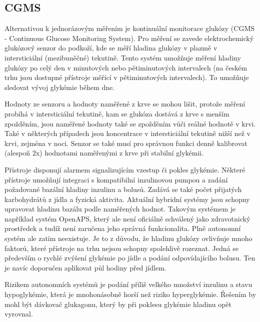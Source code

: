 \subsection{CGMS}

Alternativou k jednorázovým měřením je kontinuální monitorace glukózy (CGMS - Continuous Glucose Monitoring System). Pro měření se zavede elektrochemický glukózový senzor do podkoží, kde se měří hladina glukózy v plazmě v intersticiální (mezibuněčné) tekutině. Tento systém umožňuje měření hladiny glukózy po celý den v minutových nebo pětiminutových intervalech (na českém trhu jsou dostupné přístroje měřící v pětiminutových intervalech). To umožňuje sledovat vývoj glykémie během dne.

Hodnoty ze senzoru a hodnoty naměřené z krve se mohou lišit, protože měření probíhá v intersticiální tekutině, kam se glukóza dostává z krve s menším zpožděním, jsou naměřené hodnoty také se zpožděním vůči reálné hodnotě v krvi. Také v některých případech jsou koncentrace v intersticiální tekutině nižší než v krvi, zejména v noci. Senzor se také musí pro správnou funkci denně kalibrovat (alespoň 2x) hodnotami naměřenými z krve při stabilní glykémii. \cite{Diabetes.Perusicova}

Přístroje disponují alarmem signalizujícím vzestup či pokles glykémie. Některé přístroje umožňují integraci s kompatibilní inzulinovou pumpou a zadání požadované bazální hladiny inzulinu a bolusů. Zadává se také počet přijatých karbohydrátů z jídla a fyzická aktivita. Aktuální hybridní systémy jsou schopny upravovat hladinu bazálu podle naměřených hodnot. Takovým systémem je například systém OpenAPS, který ale není oficiálně schválený jako zdravotnický prostředek a tudíž není zaručena jeho správná funkcionalita. Plně autonomní systém ale zatím neexistuje. Je to z důvodu, že hladinu glukózy ovlivňuje mnoho faktorů, které přístroje na trhu nejsou schopny spolehlivě rozeznat. Jedná se především o rychlé zvýšení glykémie po jídle a podání odpovídajícího bolusu. Ten je navíc doporučen aplikovat půl hodiny před jídlem.

Rizikem autonomních systémů je podání příliš velkého množství inzulinu a stavu hypoglykémie, která je mnohonásobně horší než riziko hyperglykémie. Řešením by mohl být dávkovač glukagonu, který by při poklesu glykémie hladinu opět vyrovnal. \citep{cukrovka.cz}

